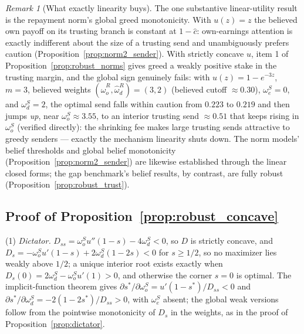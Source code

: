 \documentclass[11pt]{article}
\theoremstyle{plain}
\theoremstyle{remark}
\newtheorem{remark}{Remark}
\begin{document}
\begin{remark}[What exactly linearity buys]
The one substantive linear-utility result is the repayment norm's global greed monotonicity.  With $u(z)=z$ the believed own payoff on its trusting branch is constant at $1-\hat c$: own-earnings attention is exactly indifferent about the size of a trusting send and unambiguously prefers caution (Proposition~\ref{prop:norm2_sender}).  With strictly concave $u$, item 1 of Proposition~\ref{prop:robust_norms} gives greed a weakly positive stake in the trusting margin, and the global sign genuinely fails: with $u(z)=1-e^{-3z}$, $m=3$, believed weights $(\hat\omega_o^{R},\hat\omega_d^{R})=(3,2)$ (believed cutoff $\approx0.30$), $\omega_e^S=0$, and $\omega_d^S=2$, the optimal send falls within caution from $0.223$ to $0.219$ and then jumps \emph{up}, near $\omega_o^S\approx3.55$, to an interior trusting send $\approx0.51$ that keeps rising in $\omega_o^S$ (verified directly): the shrinking fee makes large trusting sends attractive to greedy senders --- exactly the mechanism linearity shuts down.  The norm models' belief thresholds and global belief monotonicity (Proposition~\ref{prop:norm2_sender}) are likewise established through the linear closed forms; the gap benchmark's belief results, by contrast, are fully robust (Proposition~\ref{prop:robust_trust}).
\end{remark}

\subsection*{Proof of Proposition~\ref{prop:robust_concave}}

(1) \emph{Dictator.}  $D_{ss}=\omega_o^S u''(1-s)-4\omega_d^S<0$, so $D$ is strictly concave, and $D_s=-\omega_o^S u'(1-s)+2\omega_d^S(1-2s)<0$ for $s\ge1/2$, so no maximizer lies weakly above $1/2$; a unique interior root exists exactly when $D_s(0)=2\omega_d^S-\omega_o^S u'(1)>0$, and otherwise the corner $s=0$ is optimal.  The implicit-function theorem gives $\partial s^\ast/\partial\omega_o^S=u'(1-s^\ast)/D_{ss}<0$ and $\partial s^\ast/\partial\omega_d^S=-2(1-2s^\ast)/D_{ss}>0$, with $\omega_e^S$ absent; the global weak versions follow from the pointwise monotonicity of $D_s$ in the weights, as in the proof of Proposition~\ref{prop:dictator}.
\end{document}
